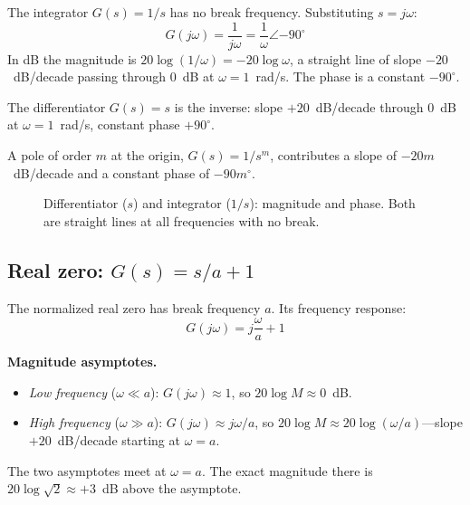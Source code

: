 \documentclass[12pt]{article}
\newcommand{\figplaceholder}[2][3in]{%
  \begin{center}
  \fbox{\parbox{#1}{\centering\vspace{0.5in}\textit{[Figure: #2]}\vspace{0.5in}}}
  \end{center}
}
\begin{document}
The integrator $G(s) = 1/s$ has no break frequency.  Substituting $s=j\omega$:
\begin{equation}
  G(j\omega) = \frac{1}{j\omega} = \frac{1}{\omega}\angle{-90^\circ}
  \label{eq:integrator}
\end{equation}
In dB the magnitude is $20\log(1/\omega) = -20\log\omega$, a straight line of
slope $-20$~dB/decade passing through 0~dB at $\omega = 1$~rad/s.  The phase
is a constant $-90^\circ$.

The differentiator $G(s) = s$ is the inverse: slope $+20$~dB/decade through
0~dB at $\omega = 1$~rad/s, constant phase $+90^\circ$.

A pole of order $m$ at the origin, $G(s) = 1/s^m$, contributes a slope of
$-20m$~dB/decade and a constant phase of $-90m^\circ$.

\begin{figure}[htbp]
  \figplaceholder[5in]{Normalized Bode plots for (a)~$G(s)=s$ and
    (b)~$G(s)=1/s$: straight-line magnitude and constant phase.
    [Nise Fig.~10.9a,b]}
  \caption{Differentiator ($s$) and integrator ($1/s$): magnitude and phase.
    Both are straight lines at all frequencies with no break.}
  \label{fig:blocks_s_1s}
\end{figure}

\subsection{Real zero: \texorpdfstring{$G(s) = s/a + 1$}{G(s) = s/a + 1}}
\label{sec:real_zero}

The normalized real zero has break frequency $a$.  Its frequency response:
\begin{equation}
  G(j\omega) = j\frac{\omega}{a} + 1
  \label{eq:real_zero_gjw}
\end{equation}

\textbf{Magnitude asymptotes.}
\begin{itemize}
  \item \emph{Low frequency} ($\omega \ll a$): $G(j\omega) \approx 1$,
    so $20\log M \approx 0$~dB.
  \item \emph{High frequency} ($\omega \gg a$): $G(j\omega) \approx j\omega/a$,
    so $20\log M \approx 20\log(\omega/a)$---slope $+20$~dB/decade starting at
    $\omega = a$.
\end{itemize}
The two asymptotes meet at $\omega = a$.  The exact magnitude there is
$20\log\sqrt{2} \approx +3$~dB above the asymptote.
\end{document}
